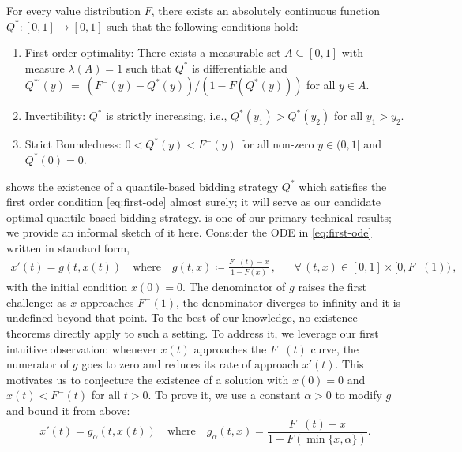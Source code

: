 \begin{lemma}\label{lemma:ode-existence}
	For every value distribution $F$, there exists an absolutely continuous function\\ ${Q^*: [0,1] \to [0,1]}$ such that the following conditions hold:
	\begin{enumerate}
		\item First-order optimality: There exists a measurable set $A \subseteq [0,1]$ with measure $\lambda(A) = 1$ such that $Q^*$ is differentiable and $ Q^{*'}(y) \ =\ (F^-(y) - Q^*(y))/(1 - F(Q^*(y)))$  for all $y \in A$.
		\item Invertibility: $Q^*$ is strictly increasing, i.e., $Q^*(y_1) > Q^*(y_2)$ for all $y_1 > y_2$.
		\item Strict Boundedness: $0 < Q^*(y) < F^-(y)$ for all non-zero $y \in (0,1]$ and $Q^*(0) = 0$.
	\end{enumerate}
\end{lemma}
 shows the existence of a quantile-based bidding strategy $Q^*$ which satisfies the first order condition \eqref{eq:first-ode} almost surely; it will serve as our candidate optimal quantile-based bidding strategy. 
 is one of our primary technical results; we provide an informal sketch of it here. 
Consider the ODE in \eqref{eq:first-ode} written in standard form,
\begin{align}
    \label{eq:main-first-ode-rewrite}
    x'(t) = g(t,x(t)) \quad \text{where}\quad g(t,x) \coloneqq \frac{F^-(t) - x}{1 - F(x)}\,, && \forall \,(t,x) 
    \in [0,1] \times [0,F^{-}(1))\,,
\end{align}
with the initial condition $x(0) = 0$. The denominator of $g$ raises the first challenge: as $x$ approaches $F^-(1)$, the denominator diverges to infinity and it is undefined beyond that point.
To the best of our knowledge, no existence theorems directly apply to such a setting. To address it, we leverage our first intuitive observation: whenever $x(t)$ approaches the $F^-(t)$ curve, the numerator of $g$ goes to zero and reduces its rate of approach $x'(t)$. This motivates us to conjecture the existence of a solution with $x(0) =0$ and $x(t) < F^-(t)$ for all $t > 0$. To prove it, we use a constant $\alpha > 0$ to modify $g$ and bound it from above:
\begin{equation*}
    x'(t) = g_\alpha(t,x(t)) \quad \text{where}\quad g_\alpha(t, x) = \frac{F^-(t) - x}{1 - F(\min\{x, \alpha\})}.
\end{equation*}
